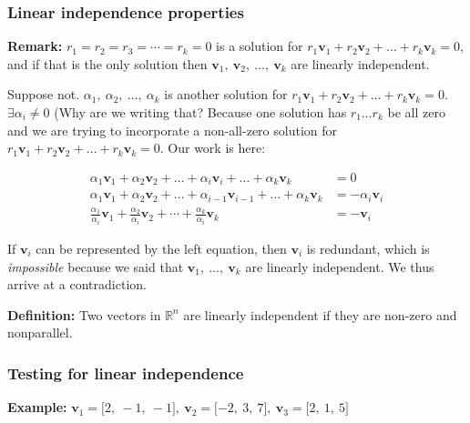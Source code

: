 \documentclass[
]{article}
\begin{document}
\subsubsection{Linear independence
properties}

\textbf{Remark:} $r_{1} = r_{2} = r_{3} = \cdots = r_{k} = 0$ is a
solution for
$r_{1}{\mathbf{v}}_{1} + r_{2}{\mathbf{v}}_{2} + \ldots + r_{k}{\mathbf{v}}_{k} = 0$,
and if that is the only solution then
${\mathbf{v}}_{1},\ {\mathbf{v}}_{2},\ \ldots,\ {\mathbf{v}}_{k}$
are linearly independent.

Suppose not. $\alpha_{1},\ \alpha_{2},\ \ldots,\ \alpha_{k}$ is
another solution for
$r_{1}{\mathbf{v}}_{1} + r_{2}{\mathbf{v}}_{2} + \ldots + r_{k}{\mathbf{v}}_{k} = 0$.
$\exists\alpha_{i} \neq 0$ (Why are we writing that? Because one
solution has $r_{1}\ldots r_{k}$ be all zero and we are trying to
incorporate a non-all-zero solution for
$r_{1}{\mathbf{v}}_{1} + r_{2}{\mathbf{v}}_{2} + \ldots + r_{k}{\mathbf{v}}_{k} = 0$.
Our work is here:

\begin{align*}
\alpha_{1}{\mathbf{v}}_{1} + \alpha_{2}{\mathbf{v}}_{2} + \ldots + \alpha_{i}{\mathbf{v}}_{i} + \ldots + \alpha_{k}{\mathbf{v}}_{k} &= 0
 \\
\alpha_{1}{\mathbf{v}}_{1} + \alpha_{2}{\mathbf{v}}_{2} + \ldots + \alpha_{i - 1}{\mathbf{v}}_{i - 1} + \ldots + \alpha_{k}{\mathbf{v}}_{k} &= - \alpha_{i}{\mathbf{v}}_{i}
 \\
\frac{\alpha_{1}}{\alpha_{i}}{\mathbf{v}}_{1} + \frac{\alpha_{2}}{\alpha_{i}}{\mathbf{v}}_{2} + \cdots + \frac{\alpha_{k}}{\alpha_{i}}{\mathbf{v}}_{k} &= - {\mathbf{v}}_{i}
\end{align*}


If ${\mathbf{v}}_{i}$ can be represented by the left equation,
then ${\mathbf{v}}_{i}$ is redundant, which is \emph{impossible}
because we said that
${\mathbf{v}}_{1},\ \ldots,\ {\mathbf{v}}_{k}$ are linearly
independent. We thus arrive at a contradiction.

\textbf{Definition:} Two vectors in $\mathbb{R}^{n}$ are linearly
independent if they are non-zero and nonparallel.


\subsubsection{Testing for linear
independence}

\textbf{Example:}
${\mathbf{v}}_{1} = \lbrack 2,\  - 1,\  - 1\rbrack,\ {\mathbf{v}}_{2} = \lbrack - 2,\ 3,\ 7\rbrack,\ {\mathbf{v}}_{3} = \lbrack 2,\ 1,\ 5\rbrack$
\end{document}

